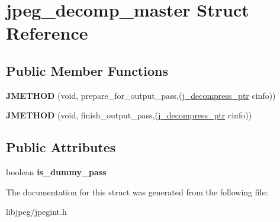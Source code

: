 \hypertarget{structjpeg__decomp__master}{\section{jpeg\-\_\-decomp\-\_\-master Struct Reference}
\label{structjpeg__decomp__master}
}
\subsection*{Public Member Functions}
\begin{DoxyCompactItemize}
\item 
\hypertarget{structjpeg__decomp__master_ab0e51667ba436fad82e7cf95b1bd4120}{{\bfseries J\-M\-E\-T\-H\-O\-D} (void, prepare\-\_\-for\-\_\-output\-\_\-pass,(\hyperlink{structjpeg__decompress__struct}{j\-\_\-decompress\-\_\-ptr} cinfo))}\label{structjpeg__decomp__master_ab0e51667ba436fad82e7cf95b1bd4120}

\item 
\hypertarget{structjpeg__decomp__master_a7dec615b828e443ddddf99078d1edb9a}{{\bfseries J\-M\-E\-T\-H\-O\-D} (void, finish\-\_\-output\-\_\-pass,(\hyperlink{structjpeg__decompress__struct}{j\-\_\-decompress\-\_\-ptr} cinfo))}\label{structjpeg__decomp__master_a7dec615b828e443ddddf99078d1edb9a}

\end{DoxyCompactItemize}
\subsection*{Public Attributes}
\begin{DoxyCompactItemize}
\item 
\hypertarget{structjpeg__decomp__master_a93cbde036bd87ab00b0ac8214e27bbe1}{boolean {\bfseries is\-\_\-dummy\-\_\-pass}}\label{structjpeg__decomp__master_a93cbde036bd87ab00b0ac8214e27bbe1}

\end{DoxyCompactItemize}


The documentation for this struct was generated from the following file\-:\begin{DoxyCompactItemize}
\item 
libjpeg/jpegint.\-h\end{DoxyCompactItemize}
